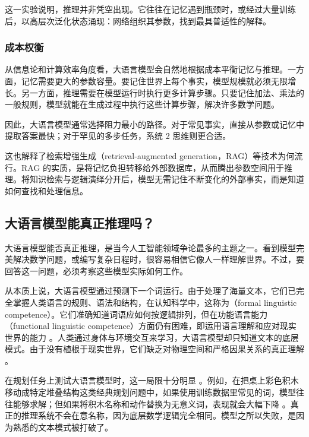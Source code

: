 这一实验说明，推理并非凭空出现。它往往在记忆遇到瓶颈时，或经过大量训练后，以高层次泛化状态涌现：网络组织其参数，找到最具普适性的解释。

\subsubsection{成本权衡}

从信息论和计算效率角度看，大语言模型会自然地根据成本平衡记忆与推理。一方面，记忆需要更大的参数容量。要记住世界上每个事实，模型规模就必须无限增长。另一方面，推理需要在模型运行时执行更多计算步骤。只要记住加法、乘法的一般规则，模型就能在生成过程中执行这些计算步骤，解决许多数学问题。

因此，大语言模型通常选择阻力最小的路径。对于常见事实，直接从参数或记忆中提取答案最快；对于罕见的多步任务，系统 2 思维则更合适。

这也解释了检索增强生成（retrieval-augmented generation，RAG）等技术为何流行。RAG 的实质，是将记忆负担转移给外部数据库，从而腾出参数空间用于推理。将知识检索与逻辑演绎分开后，模型无需记住不断变化的外部事实，而是知道如何查找和处理信息。

\subsection{大语言模型能真正推理吗？}

大语言模型能否真正推理，是当今人工智能领域争论最多的主题之一。看到模型完美解决数学问题，或编写复杂日程时，很容易相信它像人一样理解世界。不过，要回答这一问题，必须考察这些模型实际如何工作。

从本质上说，大语言模型通过预测下一个词运行。由于处理了海量文本，它们已完全掌握人类语言的规则、语法和结构，在认知科学中，这称为（formal linguistic competence）\cite{chomsky:1965aspects,mahowald-etal:2024dissociating}。它们准确知道词语应如何按逻辑排列，但在功能语言能力（functional linguistic competence）方面仍有困难，即运用语言理解和应对现实世界的能力 \cite{kambhampati-etal:2024llms}。人类通过身体与环境交互来学习，大语言模型却只知道文本的底层模式。由于没有植根于现实世界，它们缺乏对物理空间和严格因果关系的真正理解 \cite{mahowald-etal:2024dissociating}。

在规划任务上测试大语言模型时，这一局限十分明显 \cite{valmeekam-etal:2023planbench}。例如，在把桌上彩色积木移动成特定堆叠结构这类经典规划问题中，如果使用训练数据里常见的词，模型往往能够求解；但如果将积木名称和动作替换为无意义词，表现就会大幅下降 \cite{kambhampati-etal:2024can}。真正的推理系统不会在意名称，因为底层数学逻辑完全相同。模型之所以失败，是因为熟悉的文本模式被打破了。

